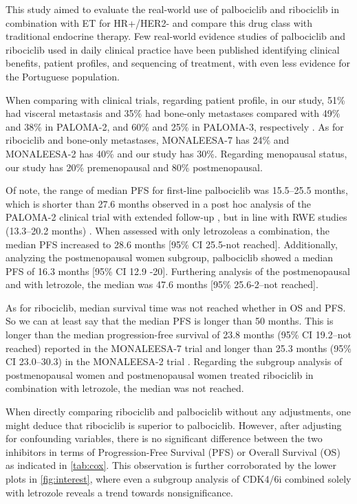 This study aimed to evaluate the real-world use of palbociclib and ribociclib in combination with ET for HR+/HER2- and compare this drug class with traditional endocrine therapy. Few real-world evidence studies of palbociclib and ribociclib used in daily clinical practice have been published identifying clinical benefits, patient profiles, and sequencing of treatment, with even less evidence for the Portuguese population.

When comparing with clinical trials, regarding patient profile, in our study, 51\% had visceral metastasis and 35\% had bone-only metastases compared with 49\% and 38\% in PALOMA-2, and 60\% and 25\% in PALOMA-3, respectively \cite{rugoImpactPalbociclibLetrozole2018,cristofanilliFulvestrantPalbociclibFulvestrant2016a}.
As for ribociclib and bone-only metastases, MONALEESA-7 \cite{tripathyRibociclibEndocrineTherapy2018} has 24\% and MONALEESA-2 has 40\% \cite{hortobagyiUpdatedResultsMONALEESA22018} and our study has 30\%.
Regarding menopausal status, our study has 20\% premenopausal and 80\% postmenopausal.


Of note, the range of median PFS for first-line palbociclib was 15.5–25.5 months, which is shorter than 27.6 months observed in a post hoc analysis of the PALOMA-2 clinical trial with extended follow-up \cite{rugoImpactPalbociclibLetrozole2018}, but in line with RWE studies (13.3–20.2 months) \cite{harbeckCDK4InhibitorsHR2021}. When assessed with only letrozoleas a combination, the median PFS increased to 28.6 months [95\% CI 25.5-not reached].
Additionally, analyzing the postmenopausal women subgroup, palbociclib showed a median PFS of 16.3 months [95\% CI 12.9 -20]. Furthering analysis of the postmenopausal and with letrozole, the median was 47.6 months [95\% 25.6-2–not reached].

As for ribociclib, median survival time was not reached whether in OS and PFS. So we can at least say that the median PFS is longer than 50 months. This is longer than the median progression-free survival of 23.8 months (95\% CI 19.2–not reached) reported in the MONALEESA-7 trial \cite{tripathyRibociclibEndocrineTherapy2018} and longer than  25.3 months (95\% CI 23.0–30.3) in the MONALEESA-2 trial \cite{hortobagyiUpdatedResultsMONALEESA22018}. 
Regarding the subgroup analysis of postmenopausal women and postmenopausal women treated ribociclib in combination with letrozole, the median was not reached.

When directly comparing ribociclib and palbociclib without any adjustments, one might deduce that ribociclib is superior to palbociclib. However, after adjusting for confounding variables, there is no significant difference between the two inhibitors in terms of Progression-Free Survival (PFS) or Overall Survival (OS) as indicated in \ref*{tab:cox}. This observation is further corroborated by the lower plots in \ref*{fig:interest}, where even a subgroup analysis of CDK4/6i combined solely with letrozole reveals a trend towards nonsignificance.

